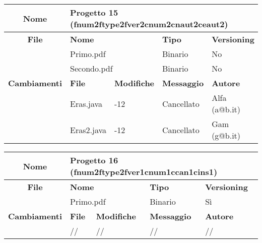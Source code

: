 \begin{table}[ht]
\footnotesize
\begin{tabular}{|c|p{2.5cm}|p{2cm}|p{2.5cm}|p{2.5cm}|}
  \hline
  \textbf{Nome}	& \multicolumn{4}{l|}{Progetto 15 (fnum2ftype2fver2cnum2cnaut2ceaut2)} 									\\
  \hline
  \rowcolor{lightgray}\textbf{File} 		& \multicolumn{2}{l|}{\textbf{Nome}}		& \textbf{Tipo}		& \textbf{Versioning} 		\\
						\cline{2-5}
						& \multicolumn{2}{l|}{Primo.pdf}		& Binario		& No				\\
						\cline{2-5}
						& \multicolumn{2}{l|}{Secondo.pdf}		& Binario		& No				\\
  \hline
  \rowcolor{lightgray}\textbf{Cambiamenti}	& \textbf{File}		&\textbf{Modifiche}	& \textbf{Messaggio}	& \textbf{Autore}		\\
						\cline{2-5}
						& Eras.java		& -12	  		& Cancellato		& Alfa (a@b.it)			\\
						\cline{2-5}
						& Eras2.java		& -12	  		& Cancellato		& Gam (g@b.it)			\\
  \hline
\end{tabular}
\end{table}






\begin{table}[ht]
\footnotesize
\begin{tabular}{|c|p{2.5cm}|p{2cm}|p{2.5cm}|p{2.5cm}|}
  \hline
  \textbf{Nome}	& \multicolumn{4}{l|}{Progetto 16 (fnum2ftype2fver1cnum1ccan1cins1)} 									\\
  \hline
  \rowcolor{lightgray}\textbf{File} 		& \multicolumn{2}{l|}{\textbf{Nome}}		& \textbf{Tipo}		& \textbf{Versioning} 		\\
						\cline{2-5}
						& \multicolumn{2}{l|}{Primo.pdf}		& Binario		& Sì				\\
  \hline
  \rowcolor{lightgray}\textbf{Cambiamenti}	& \textbf{File}		&\textbf{Modifiche}	& \textbf{Messaggio}	& \textbf{Autore}		\\
						\cline{2-5}
						& //			& //	 		& //			& //				\\
						
  \hline
\end{tabular}
\end{table}

